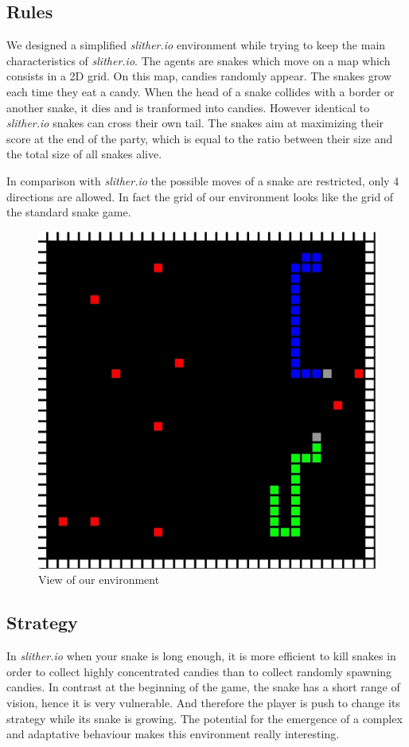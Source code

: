 \documentclass[journal, a4paper]{IEEEtran}
\begin{document}
\subsection{Rules}
We designed a simplified \emph{slither.io} environment while trying to keep the main characteristics of \emph{slither.io}. The agents are snakes which move on a map which consists in a 2D grid. On this map, candies randomly appear. The snakes grow each time they eat a candy. When the head of a snake collides with a border or another snake, it dies and is tranformed into candies. However identical to \emph{slither.io} snakes can cross their own tail. The snakes aim at maximizing their score at the end of the party, which is equal to the ratio between their size and the total size of all snakes alive.

In comparison with \emph{slither.io} the possible moves of a snake are restricted, only 4 directions are allowed. In fact the grid of our environment looks like the grid of the standard snake game. 
\begin{figure}[h]
	\centering
    \includegraphics[width=1.05\columnwidth]{images/environment.pdf}
    \caption{\label{environment}View of our environment}
\end{figure}


\subsection{Strategy}
In \emph{slither.io} when your snake is long enough, it is more efficient to kill snakes in order to collect highly concentrated candies than to collect randomly spawning candies. In contrast at the beginning of the game, the snake has a short range of vision, hence it is very vulnerable. And therefore the player is push to change its strategy while its snake is growing. The potential for the emergence of a complex and adaptative behaviour makes this environment really interesting.
\end{document}
